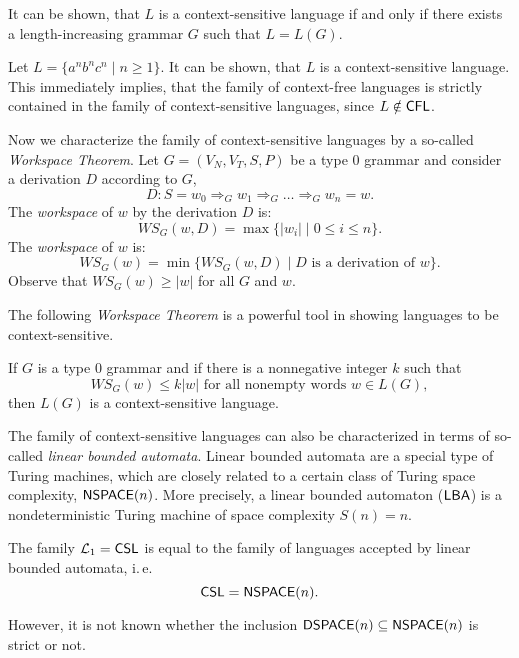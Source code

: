 It can be shown, that $L$ is a context-sensitive language if and only if there exists a length-increasing grammar $G$ such that $L = L(G)$.

Let $L = \{a^n b^n c^n \mid n \ge 1\}$. It can be shown, that $L$ is a context-sensitive language. This immediately implies, that the family of context-free languages is strictly contained in the family of context-sensitive languages, since $L \notin \textup{\sf CFL}$.

Now we characterize the family of context-sensitive languages by a so-called \emph{Workspace Theorem}. Let $G = (V_N, V_T, S, P)$ be a type $0$ grammar and consider a derivation $D$ according to $G$,
$$D: S = w_0 \Rightarrow_G w_1 \Rightarrow_G \ldots \Rightarrow_G w_n = w.$$
The \emph{workspace} of $w$ by the derivation $D$ is:
$$WS_G(w, D) = \max \{|w_i| \mid 0 \le i \le n\}.$$
The \emph{workspace} of $w$ is:
$$WS_G(w) = \min \{WS_G(w, D) \mid D \text{ is a derivation of } w\}.$$
Observe that $WS_G(w) \ge |w|$ for all $G$ and $w$.

The following \emph{Workspace Theorem} is a powerful tool in showing languages to be context-sensitive.

\begin{theorem}
If $G$ is a type $0$ grammar and if there is a nonnegative integer $k$ such that
$$WS_G(w) \le k |w| \text{ for all nonempty words } w \in L(G),$$
then $L(G)$ is a context-sensitive language.
\end{theorem}

The family of context-sensitive languages can also be characterized in terms of so-called \emph{linear bounded automata}. Linear bounded automata are a special type of Turing machines, which are closely related to a certain class of Turing space complexity, $\textup{\sf NSPACE}(n)$. More precisely, a linear bounded automaton \index{$\LBA$}($\LBA$) is a nondeterministic Turing machine of space complexity $S(n) = n$.

\begin{theorem}
The family $\mathcal{L}_1 = \textup{\sf CSL}$ is equal to the family of languages accepted by linear bounded automata, i.\,e.
$$\textup{\sf CSL} = \textup{\sf NSPACE}(n).$$
\end{theorem}

However, it is not known whether the inclusion $\textup{\sf DSPACE}(n) \subseteq \textup{\sf NSPACE}(n)$ is strict or not.

